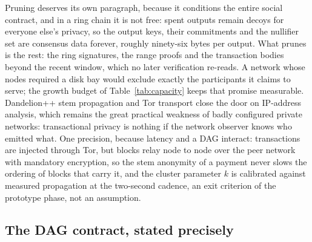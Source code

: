 Pruning deserves its own paragraph, because it conditions the entire social
contract, and in a ring chain it is not free: spent outputs remain decoys
for everyone else's privacy, so the output keys, their commitments and the
nullifier set are consensus data forever, roughly ninety-six bytes per
output. What prunes is the rest: the ring signatures, the range proofs and
the transaction bodies beyond the recent window, which no later
verification re-reads. A network whose nodes required a disk bay would
exclude exactly the participants it claims to serve; the growth budget of
Table~\ref{tab:capacity} keeps that promise measurable. Dandelion++ stem
propagation and Tor transport close the door on IP-address analysis, which
remains the great practical weakness of badly configured private networks:
transactional privacy is nothing if the network observer knows who emitted
what. One precision, because latency and a DAG interact: transactions are
injected through Tor, but blocks relay node to node over the peer network
with mandatory encryption, so the stem anonymity of a payment never slows
the ordering of blocks that carry it, and the cluster parameter $k$ is
calibrated against measured propagation at the two-second cadence, an exit
criterion of the prototype phase, not an assumption.

\subsection{The DAG contract, stated precisely}

